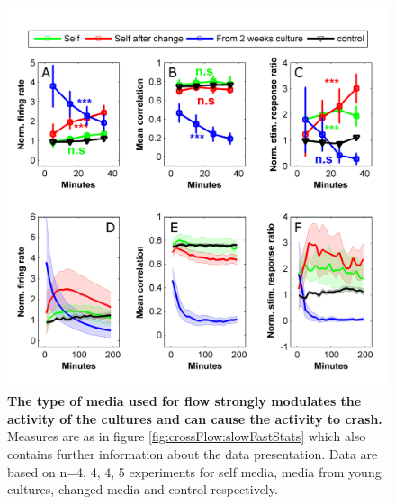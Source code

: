         \begin{figure}[!htb]
            \centering
            \includegraphics[width=15cm]{chapter5/figures/mediaChangeStats/mediaEffectStats.jpg}
            \caption[Averaged time course of activity measures in old cultures under flow with different media types]{\textbf{The type of media used for flow strongly modulates the activity of the cultures and can cause the activity to crash.} Measures are as in figure \ref{fig:crossFlow:slowFastStats} which also contains further information about the data presentation. Data are based on n=4, 4, 4, 5 experiments for self media, media from young cultures, changed media and control respectively.}

            \label{fig:crossFlow:mediaChangeStats}

        \end{figure}

